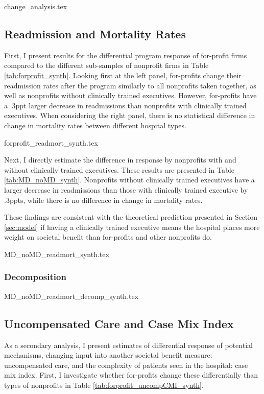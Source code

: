 \documentclass[12pt]{article}
\begin{document}
     {change_analysis.tex}

     
     \subsection{Readmission and Mortality Rates}

     First, I present results for the differential program response of for-profit firms compared to the different sub-samples of nonprofit firms in Table \ref{tab:forprofit_synth}. Looking first at the left panel, for-profits change their readmission rates after the program similarly to all nonprofits taken together, as well as nonprofits without clinically trained executives. However, for-profits have a .3ppt larger decrease in readmissions than nonprofits with clinically trained executives. When considering the right panel, there is no statistical difference in change in mortality rates between different hospital types. 

     {forprofit_readmort_synth.tex}

     Next, I directly estimate the difference in response by nonprofits with and without clinically trained executives. These results are presented in Table \ref{tab:MD_noMD_synth}. Nonprofits without clinically trained executives have a larger decrease in readmissions than those with clinically trained executive by .3ppts, while there is no difference in change in mortality rates. 

     These findings are consistent with the theoretical prediction presented in Section \ref{sec:model} if having a clinically trained executive means the hospital places more weight on societal benefit than for-profits and other nonprofits do. 

     {MD_noMD_readmort_synth.tex}

    \subsubsection{Decomposition}

    {MD_noMD_readmort_decomp_synth.tex}

     


    \subsection{Uncompensated Care and Case Mix Index}

    As a secondary analysis, I present estimates of differential response of potential mechanisms, changing input into another societal benefit measure: uncompensated care, and the complexity of patients seen in the hospital: case mix index. First, I investigate whether for-profits change these differentially than types of nonprofits in Table \ref{tab:forprofit_uncompCMI_synth}. 
\end{document}
